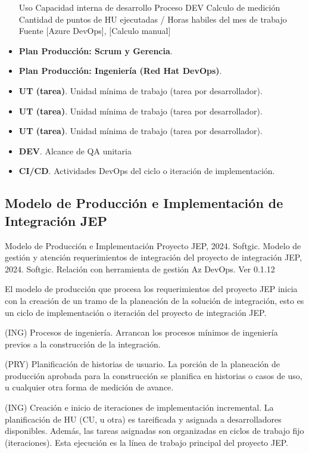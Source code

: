 \documentclass[
  paper=a4,
  ,captions=tableheading
]{scrartcl}
\renewenvironment{quote}{\begin{customblockquote}\list{}{\rightmargin=0em\leftmargin=0em}%
\item\relax\color{blockquote-text}\ignorespaces}{\unskip\unskip\endlist\end{customblockquote}}
\begin{document}
\begin{itemize}
  Uso Capacidad interna de desarrollo Proceso DEV Calculo de medición
  Cantidad de puntos de HU ejecutadas / Horas habiles del mes de trabajo
  Fuente {[}Azure DevOps{]}, {[}Calculo manual{]}
\item
  \textbf{Plan Producción: Scrum y Gerencia}.
\item
  \textbf{Plan Producción: Ingeniería (Red Hat DevOps)}.
\item
  \textbf{UT (tarea)}. Unidad mínima de trabajo (tarea por
  desarrollador).
\item
  \textbf{UT (tarea)}. Unidad mínima de trabajo (tarea por
  desarrollador).
\item
  \textbf{UT (tarea)}. Unidad mínima de trabajo (tarea por
  desarrollador).
\item
  \textbf{DEV}. Alcance de QA unitaria
\item
  \textbf{CI/CD}. Actividades DevOps del ciclo o iteración de
  implementación.
\end{itemize}

\subsection{Modelo de Producción e Implementación de Integración
JEP}\label{sec:modelo-de-producciuxf3n-e-implementaciuxf3n-de-integraciuxf3n-jep}

\begin{quote}
Modelo de Producción e Implementación Proyecto JEP, 2024. Softgic.
Modelo de gestión y atención requerimientos de integración del proyecto
de integración JEP, 2024. Softgic. Relación con herramienta de gestión
Az DevOps. Ver 0.1.12
\end{quote}

El modelo de producción que procesa los requerimientos del proyecto JEP
inicia con la creación de un tramo de la planeación de la solución de
integración, esto es un ciclo de implementación o iteración del proyecto
de integración JEP.

(ING) Procesos de ingeniería. Arrancan los procesos mínimos de
ingeniería previos a la construcción de la integración.

(PRY) Planificación de historias de usuario. La porción de la planeación
de producción aprobada para la construcción se planifica en historias o
casos de uso, u cualquier otra forma de medición de avance.

(ING) Creación e inicio de iteraciones de implementación incremental. La
planificación de HU (CU, u otra) es tareificada y asignada a
desarrolladores disponibles. Además, las tareas asignadas son
organizadas en ciclos de trabajo fijo (iteraciones). Esta ejecución es
la línea de trabajo principal del proyecto JEP.
\end{document}
